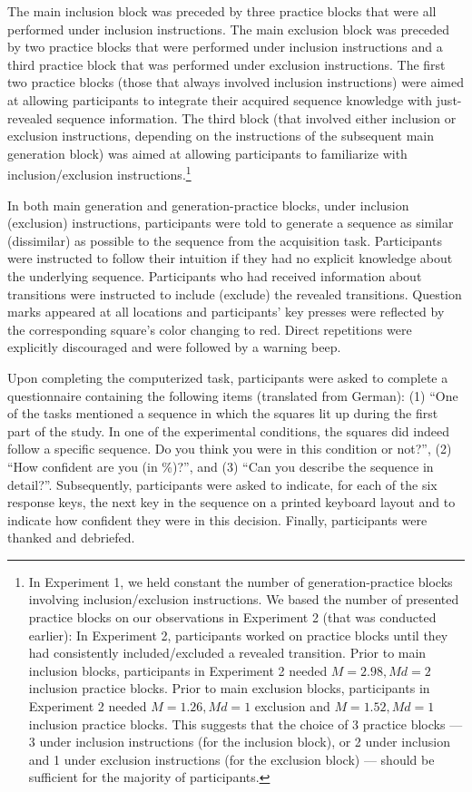 \documentclass[floatsintext,doc]{apa6}
\theoremstyle{definition}
\theoremstyle{definition}
\theoremstyle{definition}
\theoremstyle{remark}
\begin{document}
The main inclusion block was preceded by three practice blocks that were
all performed under inclusion instructions. The main exclusion block was
preceded by two practice blocks that were performed under inclusion
instructions and a third practice block that was performed under
exclusion instructions. The first two practice blocks (those that always
involved inclusion instructions) were aimed at allowing participants to
integrate their acquired sequence knowledge with just-revealed sequence
information. The third block (that involved either inclusion or
exclusion instructions, depending on the instructions of the subsequent
main generation block) was aimed at allowing participants to familiarize
with inclusion/exclusion instructions.\footnote{In Experiment 1, we held
  constant the number of generation-practice blocks involving
  inclusion/exclusion instructions. We based the number of presented
  practice blocks on our observations in Experiment 2 (that was
  conducted earlier): In Experiment 2, participants worked on practice
  blocks until they had consistently included/excluded a revealed
  transition. Prior to main inclusion blocks, participants in Experiment
  2 needed \(M = 2.98, \mathit{Md} = 2\) inclusion practice blocks.
  Prior to main exclusion blocks, participants in Experiment 2 needed
  \(M = 1.26, \mathit{Md} = 1\) exclusion and
  \(M = 1.52, \mathit{Md} = 1\) inclusion practice blocks. This suggests
  that the choice of 3 practice blocks --- 3 under inclusion
  instructions (for the inclusion block), or 2 under inclusion and 1
  under exclusion instructions (for the exclusion block) --- should be
  sufficient for the majority of participants.}

In both main generation and generation-practice blocks, under inclusion
(exclusion) instructions, participants were told to generate a sequence
as similar (dissimilar) as possible to the sequence from the acquisition
task. Participants were instructed to follow their intuition if they had
no explicit knowledge about the underlying sequence. Participants who
had received information about transitions were instructed to include
(exclude) the revealed transitions. Question marks appeared at all
locations and participants' key presses were reflected by the
corresponding square's color changing to red. Direct repetitions were
explicitly discouraged and were followed by a warning beep.

Upon completing the computerized task, participants were asked to
complete a questionnaire containing the following items (translated from
German): (1) \enquote{One of the tasks mentioned a sequence in which the
squares lit up during the first part of the study. In one of the
experimental conditions, the squares did indeed follow a specific
sequence. Do you think you were in this condition or not?}, (2)
\enquote{How confident are you (in \%)?}, and (3) \enquote{Can you
describe the sequence in detail?}. Subsequently, participants were asked
to indicate, for each of the six response keys, the next key in the
sequence on a printed keyboard layout and to indicate how confident they
were in this decision. Finally, participants were thanked and debriefed.
\end{document}
